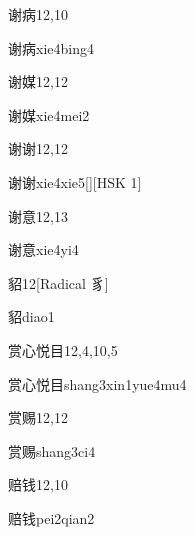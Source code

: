 \begin{entry}{谢病}{12,10}
  \begin{phonetics}{谢病}{xie4bing4}
  \end{phonetics}
\end{entry}

\begin{entry}{谢媒}{12,12}
  \begin{phonetics}{谢媒}{xie4mei2}
  \end{phonetics}
\end{entry}

\begin{entry}{谢谢}{12,12}
  \begin{phonetics}{谢谢}{xie4xie5}[][HSK 1]
  \end{phonetics}
\end{entry}

\begin{entry}{谢意}{12,13}
  \begin{phonetics}{谢意}{xie4yi4}
  \end{phonetics}
\end{entry}

\begin{entry}{貂}{12}[Radical 豸]
  \begin{phonetics}{貂}{diao1}
  \end{phonetics}
\end{entry}

\begin{entry}{赏心悦目}{12,4,10,5}
  \begin{phonetics}{赏心悦目}{shang3xin1yue4mu4}
  \end{phonetics}
\end{entry}

\begin{entry}{赏赐}{12,12}
  \begin{phonetics}{赏赐}{shang3ci4}
  \end{phonetics}
\end{entry}

\begin{entry}{赔钱}{12,10}
  \begin{phonetics}{赔钱}{pei2qian2}
  \end{phonetics}
\end{entry}


